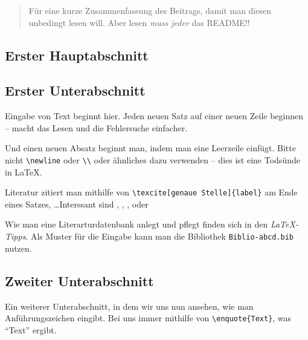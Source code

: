 
\begin{quote}
Für eine kurze Zusammenfassung des Beitrags, damit man diesen unbedingt lesen will.
Aber lesen \emph{muss jeder} das README!!
\end{quote}

\begin{refsection}
\section*{Erster Hauptabschnitt}		%
\subsection*{Erster Unterabschnitt}		%

Eingabe von Text beginnt hier.
Jeden neuen Satz auf einer neuen Zeile beginnen -- macht das Lesen und die Fehlersuche einfacher.

Und einen neuen Absatz beginnt man, indem man eine Leerzeile einfügt. 
Bitte nicht \verb|\newline| oder \verb|\\| oder ähnliches dazu verwenden -- dies ist eine Todsünde in \LaTeX{}.

Literatur zitiert man mithilfe von \verb|\texcite[genaue Stelle]{label}| am Ende eines Satzes, \zB \ldots Interssant sind \textcite{AlphaGo}, \textcite{alsina:2013},  \textcite[S.\,120]{heuser:2005}, \textcite{enumitem} oder \textcite{takesaki:1958}				

Wie man eine Literarturdatenbank anlegt und pflegt finden sich in den \emph{\LaTeX-Tipps}.
Als Muster für die Eingabe kann man die Bibliothek \texttt{Biblio-abcd.bib} nutzen.

\subsection*{Zweiter Unterabschnitt}

Ein weiterer Unterabschnitt, in dem wir uns nun ansehen, wie man Anführungszeichen eingibt.
Bei uns immer mithilfe von \verb|\enquote{Text}|, was \enquote{Text} ergibt. 


\end{refsection}
